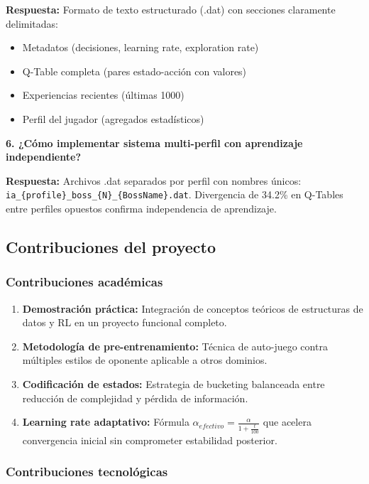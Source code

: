 \documentclass[12pt,a4paper]{article}
\begin{document}
\textbf{Respuesta:} Formato de texto estructurado (.dat) con secciones claramente delimitadas:
\begin{itemize}
    \item Metadatos (decisiones, learning rate, exploration rate)
    \item Q-Table completa (pares estado-acción con valores)
    \item Experiencias recientes (últimas 1000)
    \item Perfil del jugador (agregados estadísticos)
\end{itemize}

\textbf{6. ¿Cómo implementar sistema multi-perfil con aprendizaje independiente?}

\textbf{Respuesta:} Archivos .dat separados por perfil con nombres únicos: \texttt{ia\_\{profile\}\_boss\_\{N\}\_\{BossName\}.dat}. Divergencia de 34.2\% en Q-Tables entre perfiles opuestos confirma independencia de aprendizaje.

\subsection{Contribuciones del proyecto}

\subsubsection{Contribuciones académicas}

\begin{enumerate}
    \item \textbf{Demostración práctica:} Integración de conceptos teóricos de estructuras de datos y RL en un proyecto funcional completo.
    
    \item \textbf{Metodología de pre-entrenamiento:} Técnica de auto-juego contra múltiples estilos de oponente aplicable a otros dominios.
    
    \item \textbf{Codificación de estados:} Estrategia de bucketing balanceada entre reducción de complejidad y pérdida de información.
    
    \item \textbf{Learning rate adaptativo:} Fórmula $\alpha_{efectivo} = \frac{\alpha}{1 + \frac{t}{100}}$ que acelera convergencia inicial sin comprometer estabilidad posterior.
\end{enumerate}

\subsubsection{Contribuciones tecnológicas}
\end{document}
